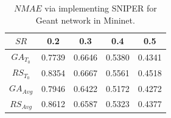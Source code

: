 \begin{table}
	\centering
		\begin{tabular}{| c | c | c | c | c |}
		\hline
       $SR$           & 0.2    &  0.3    &  0.4    &  0.5  \\ \hline
      $GA_{T_{0}}$    & 0.7739 &	0.6646 &	0.5380 &	0.4341     \\ \hline
      $RS_{T_{0}}$    & 0.8354 &	0.6667 &	0.5561 &	0.4518     \\ \hline
      $GA_{{Avg}}$    & 0.7946 &	0.6422 & 	0.5172 &	0.4272     \\ \hline
      $RS_{{Avg}}$    & 0.8612 &	0.6587 &	0.5323 &	0.4377     \\ \hline
    \end{tabular}
		\vspace{0.15cm}
	\caption{{$NMAE$ via implementing SNIPER for Geant network in Mininet.}}
	\label{tab:SNIPERGeantMininetRes}
\end{table}








